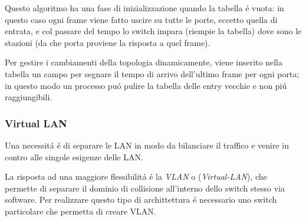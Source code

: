\documentclass[12pt]{article}
\begin{document}
Questo algoritmo ha una fase di inizializzazione quando la tabella \'e vuota: in questo caso ogni frame viene fatto uscire 
su tutte le porte, eccetto quella di entrata, e col passare del tempo lo switch impara (riempie la tabella) dove sono le
stazioni (da che porta proviene la risposta a quel frame).

Per gestire i cambiamenti della topologia dinamicamente, viene inserito nella tabella un campo per segnare il tempo di 
arrivo dell'ultimo frame per ogni porta; in questo modo un processo pu\'o pulire la tabella delle entry vecchie e non pi\'u 
raggiungibili.

\subsubsection{Virtual LAN} \label{ieee-802-vlan}
Una necessit\'a \'e di separare le LAN in modo da bilanciare il traffico e venire in contro alle singole esigenze delle LAN.

La risposta ad una maggiore flessibilit\'a \'e la \textit{VLAN} o (\textit{Virtual-LAN}), che permette di separare il 
dominio di collisione all'interno dello switch stesso via software. Per realizzare questo tipo di archittettura \'e 
necessario uno switch particolare che permetta di creare VLAN.
\end{document}
